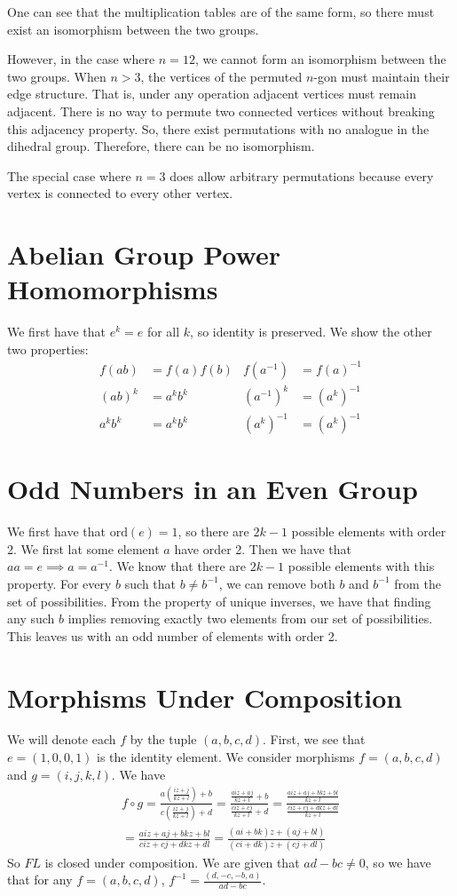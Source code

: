 \documentclass[12pt]{article}
\newcommand*{\ord}{\mathrm{ord}}
\newcommand*{\inv}{^{-1}}
\begin{document}
One can see that the multiplication tables are of the same form, so there must exist an isomorphism between the two groups.

However, in the case where $n = 12$, we cannot form an isomorphism between the two groups. When $n > 3$, the vertices of the permuted $n$-gon must maintain their edge structure. That is, under any operation adjacent vertices must remain adjacent. There is no way to permute two connected vertices without breaking this adjacency property. So, there exist permutations with no analogue in the dihedral group. Therefore, there can be no isomorphism.

The special case where $n = 3$ does allow arbitrary permutations because every vertex is connected to every other vertex.


\section{Abelian Group Power Homomorphisms}
We first have that $e^k = e$ for all $k$, so identity is preserved. We show the other two properties:
\begin{align*}
f(ab)  &= f(a)f(b) & f(a\inv)  &= f(a)\inv\\
(ab)^k &= a^kb^k   & (a\inv)^k &= (a^k)\inv\\
a^kb^k &= a^kb^k   & (a^k)\inv &= (a^k)\inv
\end{align*}


\section{Odd Numbers in an Even Group}
We first have that $\ord(e) = 1$, so there are $2k - 1$ possible elements with order 2. We first lat some element $a$ have order 2. Then we have that $aa = e \implies a = a\inv$. We know that there are $2k - 1$ possible elements with this property. For every $b$ such that $b \neq b\inv$, we can remove both $b$ and $b\inv$ from the set of possibilities. From the property of unique inverses, we have that finding any such $b$ implies removing exactly two elements from our set of possibilities. This leaves us with an odd number of elements with order 2.

\section{Morphisms Under Composition}
We will denote each $f$ by the tuple $(a,b,c,d)$. First, we see that $e = (1, 0, 0, 1)$ is the identity element. We consider morphisms $f = (a,b,c,d)$ and $g = (i,j,k,l)$. We have
\begin{align*}
f \circ g   = \frac{a(\frac{iz + j}{kz + l}) + b}{c(\frac{iz + j}{kz + l}) + d}
            = \frac{\frac{aiz + aj}{kz + l} + b}{\frac{ciz + cj}{kz + l} + d}
            = \frac{\frac{aiz + aj + bkz + bl}{kz + l}}{\frac{ciz + cj +dkz + dl}{kz + l}}\\
= \frac{aiz + aj + bkz + bl}{ciz + cj + dkz + dl}
= \frac{(ai + bk)z + (aj + bl)}{(ci +dk)z + (cj + dl)}
\end{align*}
So $FL$ is closed under composition. We are given that $ad - bc \neq 0$, so we have that for any $f = (a,b,c,d)$, $f\inv = \frac{(d,-c,-b, a)}{ad - bc}$. 
\end{document}
